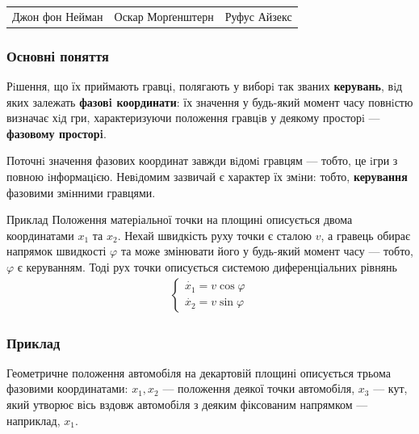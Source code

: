 \documentclass[10pt,pdf,aspectratio=169]{beamer}
\newcommand{\vf}{\varphi}
\renewcommand{\d}[1]{\dot{#1}}
\begin{document}
\begin{frame}
\begin{center}
\begin{tabular}{c c c}
                Джон фон Нейман &
                Оскар Морґенштерн &
                Руфус Айзекс
            \end{tabular}
        \end{center}
    \end{frame}
    \begin{frame}
        \frametitle{Основні поняття}
    
        Рiшення, що їх приймають гравцi, полягають у виборi так званих \textbf{керувань}, вiд яких залежать \textbf{фазовi координати}: 
        їх значення у будь-який момент часу повнiстю визначає хiд гри, характеризуючи положення гравцiв у деякому просторi — \textbf{фазовому просторi}. 

        Поточнi значення фазових координат завжди вiдомi
        гравцям — тобто, це iгри з повною iнформацiєю. Невiдомим зазвичай є
        характер їх змiни: тобто, \textbf{керування} фазовими змiнними гравцями.
        \begin{block}{Приклад}
            Положення матеріальної точки на площині описується двома координатами $x_1$ та $x_2$. 
            Нехай швидкість руху точки є сталою $v$, а гравець обирає напрямок швидкості $\vf$ та може змінювати його у будь-який момент часу --- тобто, $\vf$
            є керуванням. Тоді рух точки описується системою диференціальних рівнянь
            \begin{gather*}
                \begin{cases}
                    \d{x_1} = v \cos \vf \\
                    \d{x_2} = v \sin \vf
                \end{cases}
            \end{gather*}
        \end{block}
    \end{frame}
    \begin{frame}
        \frametitle{Приклад}
    
        Геометричне положення автомобіля на декартовій площині описується трьома фазовими координатами:
        $x_1, x_2$ --- положення деякої точки автомобіля, $x_3$ --- кут, який утворює вісь вздовж автомобіля
        з деяким фіксованим напрямком --- наприклад, $x_1$.
        \begin{center}
        \end{center}
    \end{frame}
\end{document}
